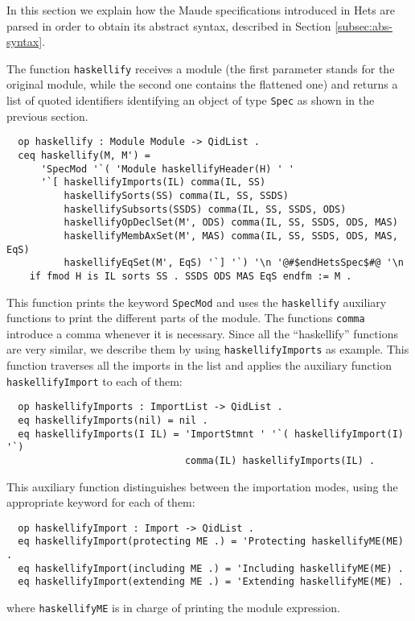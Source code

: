 
In this section we explain how the Maude specifications introduced in
Hets are parsed in order to obtain its abstract syntax, described in
Section \ref{subsec:abs-syntax}.

The function \verb"haskellify" receives a module (the first parameter
stands for the original module, while the second one contains the
flattened one) and returns a list of quoted identifiers identifying an
object of type \verb"Spec" as shown in the previous section.

{\codesize
\begin{verbatim}
  op haskellify : Module Module -> QidList .
  ceq haskellify(M, M') = 
      'SpecMod '`( 'Module haskellifyHeader(H) ' ' 
      '`[ haskellifyImports(IL) comma(IL, SS)
          haskellifySorts(SS) comma(IL, SS, SSDS)
          haskellifySubsorts(SSDS) comma(IL, SS, SSDS, ODS)
          haskellifyOpDeclSet(M', ODS) comma(IL, SS, SSDS, ODS, MAS)
          haskellifyMembAxSet(M', MAS) comma(IL, SS, SSDS, ODS, MAS, EqS)
          haskellifyEqSet(M', EqS) '`] '`) '\n '@#$endHetsSpec$#@ '\n
    if fmod H is IL sorts SS . SSDS ODS MAS EqS endfm := M .
\end{verbatim}
}

This function prints the keyword \verb"SpecMod" and uses the \verb"haskellify"
auxiliary functions to print the different parts of the module.
The functions \verb"comma" introduce a comma whenever it is necessary.
Since all the ``haskellify'' functions are very similar, we describe
them by using \verb"haskellifyImports" as example. This function traverses
all the imports in the list and applies the auxiliary function
\verb"haskellifyImport" to each of them:

{\codesize
\begin{verbatim}
  op haskellifyImports : ImportList -> QidList .
  eq haskellifyImports(nil) = nil .
  eq haskellifyImports(I IL) = 'ImportStmnt ' '`( haskellifyImport(I) '`)
                               comma(IL) haskellifyImports(IL) .
\end{verbatim}
}

This auxiliary function distinguishes between the importation modes,
using the appropriate keyword for each of them:

{\codesize
\begin{verbatim}
  op haskellifyImport : Import -> QidList .
  eq haskellifyImport(protecting ME .) = 'Protecting haskellifyME(ME) .
  eq haskellifyImport(including ME .) = 'Including haskellifyME(ME) .
  eq haskellifyImport(extending ME .) = 'Extending haskellifyME(ME) .
\end{verbatim}
}

\noindent where \verb"haskellifyME" is in charge of printing the 
module expression.


